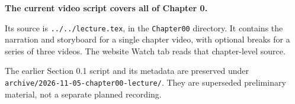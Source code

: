 \textbf{The current video script covers all of Chapter 0.}

Its source is \texttt{../../lecture.tex}, in the \texttt{Chapter00} directory. It contains the narration and storyboard for a single chapter video, with optional breaks for a series of three videos. The website Watch tab reads that chapter-level source.

The earlier Section 0.1 script and its metadata are preserved under \texttt{archive/2026-11-05-chapter00-lecture/}. They are superseded preliminary material, not a separate planned recording.
